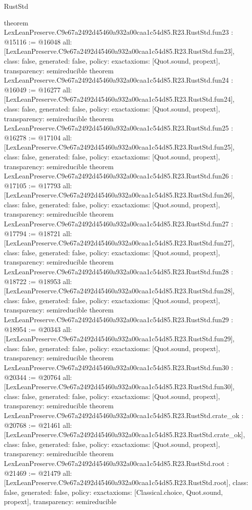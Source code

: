 \begin{lexlean}{RustStd}
\begin{coremodule}
{}
theorem LexLeanPreserve.C9e67a2492d45460a932a00caa1c54d85.R23.RustStd.fun23 : @15116 := @16048 {
  all: [LexLeanPreserve.C9e67a2492d45460a932a00caa1c54d85.R23.RustStd.fun23],
  class: false,
  generated: false,
  policy: exact{axioms: [Quot.sound, propext]},
  transparency: semireducible
}
theorem LexLeanPreserve.C9e67a2492d45460a932a00caa1c54d85.R23.RustStd.fun24 : @16049 := @16277 {
  all: [LexLeanPreserve.C9e67a2492d45460a932a00caa1c54d85.R23.RustStd.fun24],
  class: false,
  generated: false,
  policy: exact{axioms: [Quot.sound, propext]},
  transparency: semireducible
}
theorem LexLeanPreserve.C9e67a2492d45460a932a00caa1c54d85.R23.RustStd.fun25 : @16278 := @17104 {
  all: [LexLeanPreserve.C9e67a2492d45460a932a00caa1c54d85.R23.RustStd.fun25],
  class: false,
  generated: false,
  policy: exact{axioms: [Quot.sound, propext]},
  transparency: semireducible
}
theorem LexLeanPreserve.C9e67a2492d45460a932a00caa1c54d85.R23.RustStd.fun26 : @17105 := @17793 {
  all: [LexLeanPreserve.C9e67a2492d45460a932a00caa1c54d85.R23.RustStd.fun26],
  class: false,
  generated: false,
  policy: exact{axioms: [Quot.sound, propext]},
  transparency: semireducible
}
theorem LexLeanPreserve.C9e67a2492d45460a932a00caa1c54d85.R23.RustStd.fun27 : @17794 := @18721 {
  all: [LexLeanPreserve.C9e67a2492d45460a932a00caa1c54d85.R23.RustStd.fun27],
  class: false,
  generated: false,
  policy: exact{axioms: [Quot.sound, propext]},
  transparency: semireducible
}
theorem LexLeanPreserve.C9e67a2492d45460a932a00caa1c54d85.R23.RustStd.fun28 : @18722 := @18953 {
  all: [LexLeanPreserve.C9e67a2492d45460a932a00caa1c54d85.R23.RustStd.fun28],
  class: false,
  generated: false,
  policy: exact{axioms: [Quot.sound, propext]},
  transparency: semireducible
}
theorem LexLeanPreserve.C9e67a2492d45460a932a00caa1c54d85.R23.RustStd.fun29 : @18954 := @20343 {
  all: [LexLeanPreserve.C9e67a2492d45460a932a00caa1c54d85.R23.RustStd.fun29],
  class: false,
  generated: false,
  policy: exact{axioms: [Quot.sound, propext]},
  transparency: semireducible
}
theorem LexLeanPreserve.C9e67a2492d45460a932a00caa1c54d85.R23.RustStd.fun30 : @20344 := @20764 {
  all: [LexLeanPreserve.C9e67a2492d45460a932a00caa1c54d85.R23.RustStd.fun30],
  class: false,
  generated: false,
  policy: exact{axioms: [Quot.sound, propext]},
  transparency: semireducible
}
theorem LexLeanPreserve.C9e67a2492d45460a932a00caa1c54d85.R23.RustStd.crate_ok : @20768 := @21461 {
  all: [LexLeanPreserve.C9e67a2492d45460a932a00caa1c54d85.R23.RustStd.crate_ok],
  class: false,
  generated: false,
  policy: exact{axioms: [Quot.sound, propext]},
  transparency: semireducible
}
theorem LexLeanPreserve.C9e67a2492d45460a932a00caa1c54d85.R23.RustStd.root : @21469 := @21479 {
  all: [LexLeanPreserve.C9e67a2492d45460a932a00caa1c54d85.R23.RustStd.root],
  class: false,
  generated: false,
  policy: exact{axioms: [Classical.choice, Quot.sound, propext]},
  transparency: semireducible
}


\end{coremodule}
\end{lexlean}
